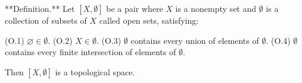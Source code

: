 **Definition.** Let $[X, \emptyset]$ be a pair where $X$ is a nonempty set and $\emptyset$ is a collection of subsets of $X$ called open sets, satisfying:

(O.1) $\varnothing \in \emptyset$.
(O.2) $X \in \emptyset$.
(O.3) $\emptyset$ contains every union of elements of $\emptyset$.
(O.4) $\emptyset$ contains every finite intersection of elements of $\emptyset$.

Then $[X, \emptyset]$ is a topological space.
